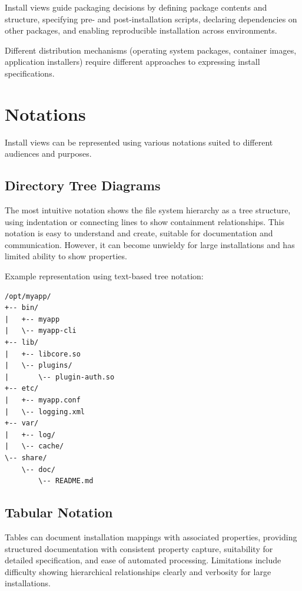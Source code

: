 \documentclass[11pt]{article}
\begin{document}
Install views guide packaging decisions by defining package contents and structure, specifying pre- and post-installation scripts, declaring dependencies on other packages, and enabling reproducible installation across environments.

Different distribution mechanisms (operating system packages, container images, application installers) require different approaches to expressing install specifications.

\section{Notations}

Install views can be represented using various notations suited to different audiences and purposes.

\subsection{Directory Tree Diagrams}

The most intuitive notation shows the file system hierarchy as a tree structure, using indentation or connecting lines to show containment relationships. This notation is easy to understand and create, suitable for documentation and communication. However, it can become unwieldy for large installations and has limited ability to show properties.

Example representation using text-based tree notation:

\begin{verbatim}
/opt/myapp/
+-- bin/
|   +-- myapp
|   \-- myapp-cli
+-- lib/
|   +-- libcore.so
|   \-- plugins/
|       \-- plugin-auth.so
+-- etc/
|   +-- myapp.conf
|   \-- logging.xml
+-- var/
|   +-- log/
|   \-- cache/
\-- share/
    \-- doc/
        \-- README.md
\end{verbatim}

\subsection{Tabular Notation}

Tables can document installation mappings with associated properties, providing structured documentation with consistent property capture, suitability for detailed specification, and ease of automated processing. Limitations include difficulty showing hierarchical relationships clearly and verbosity for large installations.
\end{document}
